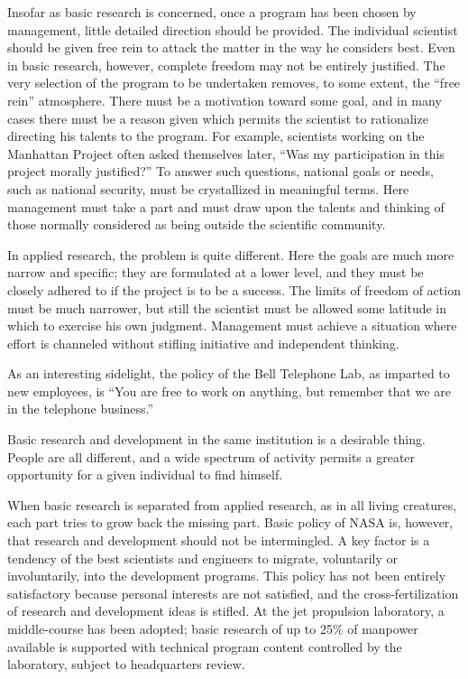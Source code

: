 \documentclass{memoir}
\begin{document}
Insofar as basic research is concerned, once a program has been chosen by management, little detailed direction should be provided. The individual scientist should be given free rein to attack the matter in the way he considers best. Even in basic research, however, complete freedom may not be entirely justified. The very selection of the program to be undertaken removes, to some extent, the ``free rein'' atmosphere. There must be a motivation toward some goal, and in many cases there must be a reason given which permits the scientist to rationalize directing his talents to the program. For example, scientists working on the Manhattan Project often asked themselves later, ``Was my participation in this project morally justified?'' To answer such questions, national goals or needs, such as national security, must be crystallized in meaningful terms. Here management must take a part and must draw upon the talents and thinking of those normally considered as being outside the scientific community.

In applied research, the problem is quite different. Here the goals are much more narrow and specific; they are formulated at a lower level, and they must be closely adhered to if the project is to be a success. The limits of freedom of action must be much narrower, but still the scientist must be allowed some latitude in which to exercise his own judgment. Management must achieve a situation where effort is channeled without stifling initiative and independent thinking.

As an interesting sidelight, the policy of the Bell Telephone Lab, as imparted to new employees, is ``You are free to work on anything, but remember that we are in the telephone business.''

Basic research and development in the same institution is a desirable thing. People are all different, and a wide spectrum of activity permits a greater opportunity for a given individual to find himself.

When basic research is separated from applied research, as in all living creatures, each part tries to grow back the missing part. Basic policy of NASA is, however, that research and development should not be intermingled. A key factor is a tendency of the best scientists and engineers to migrate, voluntarily or involuntarily, into the development programs. This policy has not been entirely satisfactory because personal interests are not satisfied, and the cross-fertilization of research and development ideas is stifled. At the jet propulsion laboratory, a middle-course has been adopted; basic research of up to 25\% of manpower available is supported with technical program content controlled by the laboratory, subject to headquarters review.
\end{document}
